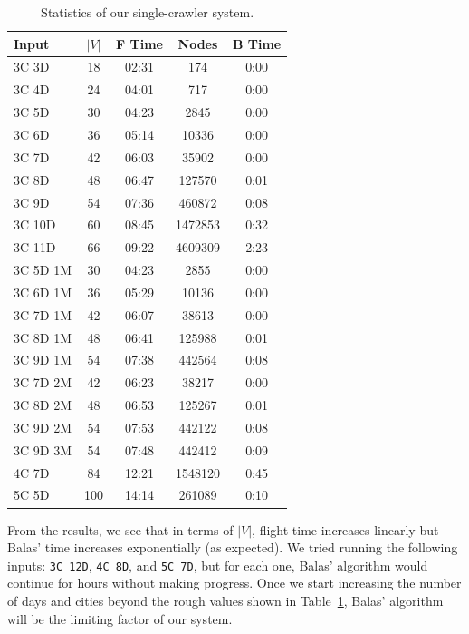 \documentclass{article}
\begin{document}
\begin{table}[t]
\caption{Statistics of our single-crawler system.}
\label{tab:single-node}
\vskip 0.15in
\begin{center}
\begin{small}
\begin{sc}
\begin{tabular}{lcccc}
\hline
\abovespace\belowspace
Input & $|V|$ & F Time & Nodes & B Time \\
\hline
\abovespace
3C 3D    & 18  & 02:31 & 174     & 0:00  \\
3C 4D    & 24  & 04:01 & 717     & 0:00  \\
3C 5D    & 30  & 04:23 & 2845    & 0:00  \\
3C 6D    & 36  & 05:14 & 10336   & 0:00  \\
3C 7D    & 42  & 06:03 & 35902   & 0:00  \\
3C 8D    & 48  & 06:47 & 127570  & 0:01  \\
3C 9D    & 54  & 07:36 & 460872  & 0:08  \\
3C 10D   & 60  & 08:45 & 1472853 & 0:32  \\
3C 11D   & 66  & 09:22 & 4609309 & 2:23  \\
3C 5D 1M & 30  & 04:23 & 2855    & 0:00  \\
3C 6D 1M & 36  & 05:29 & 10136   & 0:00  \\
3C 7D 1M & 42  & 06:07 & 38613   & 0:00  \\
3C 8D 1M & 48  & 06:41 & 125988  & 0:01  \\
3C 9D 1M & 54  & 07:38 & 442564  & 0:08  \\
3C 7D 2M & 42  & 06:23 & 38217   & 0:00  \\
3C 8D 2M & 48  & 06:53 & 125267  & 0:01  \\
3C 9D 2M & 54  & 07:53 & 442122  & 0:08  \\
3C 9D 3M & 54  & 07:48 & 442412  & 0:09  \\
4C 7D    & 84  & 12:21 & 1548120 & 0:45  \\
\belowspace
5C 5D    & 100 & 14:14 & 261089  & 0:10  \\
\hline
\end{tabular}
\end{sc}
\end{small}
\end{center}
\vskip -0.1in
\end{table}

From the results, we see that in terms of $|V|$, flight time increases linearly but Balas' time increases exponentially (as expected). We tried
running the following inputs: \texttt{3C 12D}, \texttt{4C 8D}, and \texttt{5C 7D}, but for each one, Balas' algorithm would continue for hours without
making progress. Once we start increasing the number of days and cities beyond the rough values shown in Table~\ref{tab:single-node}, Balas' algorithm
will be the limiting factor of our system.
\end{document}

